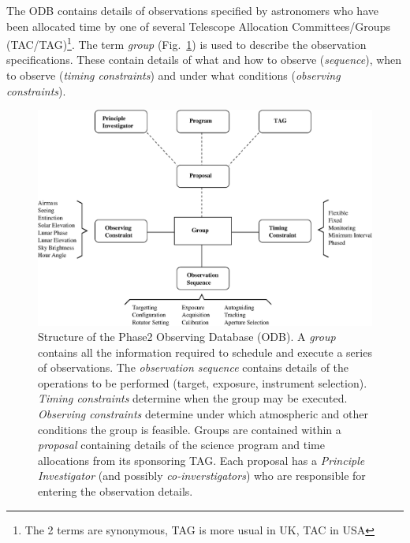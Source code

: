 
The ODB contains details of observations specified by astronomers who have been allocated time by one of several Telescope Allocation Committees/Groups (TAC/TAG)\footnote{The 2 terms are synonymous, TAG is more usual in UK, TAC in USA}.
The term \emph{group} (Fig.~\ref{fig:group}) is used to describe the observation specifications. These contain details of what and how to observe (\emph{sequence}), when to observe (\emph{timing constraints}) and under what conditions (\emph{observing constraints}). 

\begin{figure}[htbp]  
  \begin{center}
    \includegraphics[scale=0.6, angle=0]{figures/group_structure.eps}
  \end{center}
  \caption[Structure of the Phase2 Observing Database (ODB).]
   {Structure of the Phase2 Observing Database (ODB). A \emph{group} contains all the information required to schedule and execute a series of observations. The \emph{observation sequence} contains details of the operations to be performed (target, exposure, instrument selection). \emph{Timing constraints} determine when the group may be executed. \emph{Observing constraints} determine under which atmospheric and other conditions the group is feasible. Groups are contained within a \emph{proposal} containing details of the science program and time allocations from its sponsoring TAG. Each proposal has a \emph{Principle Investigator} (and possibly \emph{co-inverstigators}) who are responsible for entering the observation details.}
  \label{fig:group}
\end{figure}


